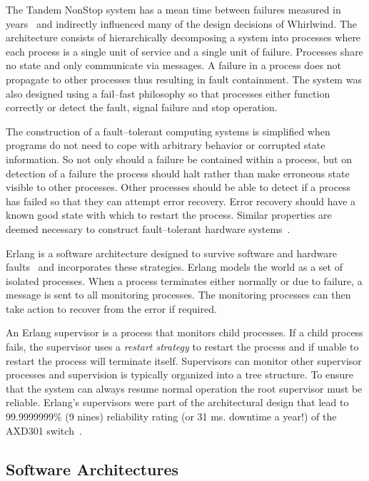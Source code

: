 \documentclass[conference]{IEEEtran}
\begin{document}
The Tandem NonStop system has a mean time between failures measured in years~\cite{Grey85Fail} and indirectly influenced many of the design decisions of Whirlwind. The architecture consists of hierarchically decomposing a system into processes where each process is a single unit of service and a single unit of failure. Processes share no state and only communicate via messages. A failure in a process does not propagate to other processes thus resulting in fault containment. The system was also designed using a fail--fast philosophy so that processes either function correctly or detect the fault, signal failure and stop operation.

The construction of a fault--tolerant computing systems is simplified when programs do not need to cope with arbitrary behavior or corrupted state information. So not only should a failure be contained within a process, but on detection of a failure the process should halt rather than make erroneous state visible to other processes. Other processes should be able to detect if a process has failed so that they can attempt error recovery. Error recovery should have a known good state with which to restart the process. Similar properties are deemed necessary to construct fault--tolerant hardware systems~\cite{Schneider:FailStopProcessors}.  

Erlang is a software architecture designed to survive software and hardware faults~\cite{Armstrong03Thesis} and incorporates these strategies. Erlang models the world as a set of isolated processes. When a process terminates either normally or due to failure, a message is sent to all monitoring processes. The monitoring processes can then take action to recover from the error if required.

An Erlang supervisor is a process that monitors child processes. If a child process fails, the supervisor uses a \emph{restart strategy} to restart the process and if unable to restart the process will terminate itself. Supervisors can monitor other supervisor processes and supervision is typically organized into a tree structure. To ensure that the system can always resume normal operation the root supervisor must be reliable. Erlang's supervisors were part of the architectural design that lead to 99.9999999\% (9 nines) reliability rating (or 31 ms. downtime a year!) of the AXD301 switch~\cite{armstrong:02:COP}.

\subsection{Software Architectures}
\end{document}
